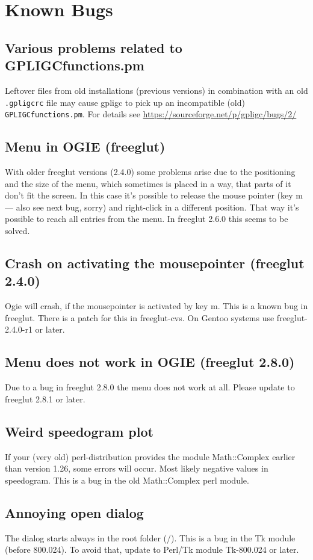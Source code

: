 \section{Known Bugs}
\label{bugs}

\subsection*{Various problems related to GPLIGCfunctions.pm}
Leftover files from old installations (previous versions) in combination with an old \texttt{.gpligcrc}
file may cause gpligc to pick up an incompatible (old) \texttt{GPLIGCfunctions.pm}.
For details see \url{https://sourceforge.net/p/gpligc/bugs/2/}

\subsection*{Menu in OGIE (freeglut)}
With older freeglut versions (2.4.0) some problems arise due to the positioning and the size of the
menu, which sometimes is placed in a way, that parts of it don't fit the screen.
In this case it's possible to release the mouse pointer (key m --- also see next bug, sorry) and right-click in a different position. That way it's possible to reach all entries from the menu.
In freeglut 2.6.0 this seems to be solved.

\subsection*{Crash on activating the mousepointer (freeglut 2.4.0)}
Ogie will crash, if the mousepointer is activated by key m. This is a known bug in freeglut.
There is a patch for this in freeglut-cvs. On Gentoo systems use freeglut-2.4.0-r1 or later.

\subsection*{Menu does not work in OGIE (freeglut 2.8.0)}
Due to a bug in freeglut 2.8.0 the menu does not work at all.
Please update to freeglut 2.8.1 or later.

\subsection*{Weird speedogram plot}
If your (very old) perl-distribution provides the module Math::Complex earlier
than version 1.26, some errors will occur. Most likely negative values in
speedogram. This is a bug in the old Math::Complex perl module.

\subsection*{Annoying open dialog}
The  dialog starts always in the root folder (/). This is  a bug in the
Tk module (before 800.024). To avoid that, update to Perl/Tk module Tk-800.024 or later.

